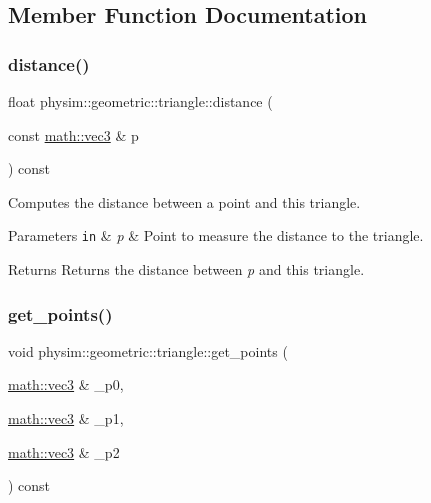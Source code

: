 \subsection{Member Function Documentation}
\mbox{\label{classphysim_1_1geometric_1_1triangle_a0fd4b6ef7082472c82b7e0d5d73f10fc}} 
\subsubsection{\texorpdfstring{distance()}{distance()}}
{\footnotesize\ttfamily float physim\+::geometric\+::triangle\+::distance (\begin{DoxyParamCaption}\item[{const \hyperlink{structphysim_1_1math_1_1vec3}{math\+::vec3} \&}]{p }\end{DoxyParamCaption}) const}



Computes the distance between a point and this triangle. 


\begin{DoxyParams}[1]{Parameters}
\mbox{\tt in}  & {\em p} & Point to measure the distance to the triangle. \\
\hline
\end{DoxyParams}
\begin{DoxyReturn}{Returns}
Returns the distance between {\itshape p} and this triangle. 
\end{DoxyReturn}
\mbox{\label{classphysim_1_1geometric_1_1triangle_aaf1c684ae7810629c3ca478c25303ffa}} 
\subsubsection{\texorpdfstring{get\+\_\+points()}{get\_points()}}
{\footnotesize\ttfamily void physim\+::geometric\+::triangle\+::get\+\_\+points (\begin{DoxyParamCaption}\item[{\hyperlink{structphysim_1_1math_1_1vec3}{math\+::vec3} \&}]{\+\_\+p0,  }\item[{\hyperlink{structphysim_1_1math_1_1vec3}{math\+::vec3} \&}]{\+\_\+p1,  }\item[{\hyperlink{structphysim_1_1math_1_1vec3}{math\+::vec3} \&}]{\+\_\+p2 }\end{DoxyParamCaption}) const}



